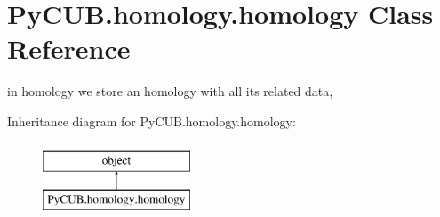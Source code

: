 \hypertarget{class_py_c_u_b_1_1homology_1_1homology}{}\section{Py\+C\+U\+B.\+homology.\+homology Class Reference}
\label{class_py_c_u_b_1_1homology_1_1homology}


in homology we store an homology with all its related data,  


Inheritance diagram for Py\+C\+U\+B.\+homology.\+homology\+:\begin{figure}[H]
\begin{center}
\leavevmode
\includegraphics[height=2.000000cm]{class_py_c_u_b_1_1homology_1_1homology}
\end{center}
\end{figure}
